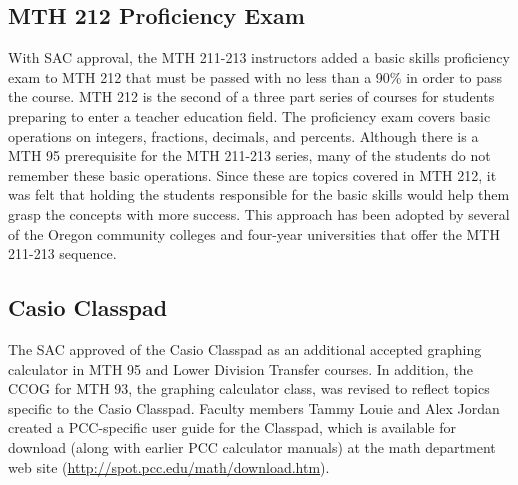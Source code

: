 \subsection{MTH 212 Proficiency Exam}
With SAC approval, the MTH 211-213 instructors added a basic skills proficiency exam to MTH 212 that must be passed with no less than a 90\% in order to pass the course.  MTH 212 is the second of a three part series of courses for students preparing to enter a teacher education field. The proficiency exam covers basic operations on integers, fractions, decimals, and percents.  Although there is a MTH 95 prerequisite for the MTH 211-213 series, many of the students do not remember these basic operations. Since these are topics covered in MTH 212, it was felt that holding the students responsible for the basic skills would help them grasp the concepts with more success.  This approach has been adopted by several of the Oregon community colleges and four-year universities that offer the MTH 211-213 sequence.

\subsection{Casio Classpad}
The SAC approved of the Casio Classpad as an additional accepted graphing calculator in MTH 95 and Lower Division Transfer courses. In addition, the CCOG for MTH 93, the graphing calculator class, was revised to reflect topics specific to the Casio Classpad. Faculty members Tammy Louie and Alex Jordan created a PCC-specific user guide for the Classpad, which is available for download (along with earlier PCC calculator manuals) at the math department web site (\href{http://spot.pcc.edu/math/download.htm}{http://spot.pcc.edu/math/download.htm}). 
 
 


